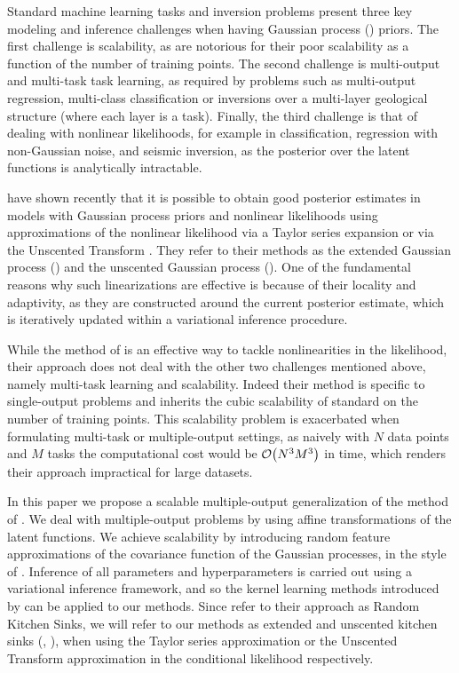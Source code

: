 Standard machine learning tasks and inversion problems present three key
modeling and inference challenges when having Gaussian process (\gp) priors.
The first challenge is scalability, as  are notorious for their poor
scalability as a function of the number of training points. The second
challenge is multi-output and multi-task task learning, as required by problems
such as multi-output regression, multi-class classification or inversions over a
multi-layer geological structure (where each layer is a task).  Finally, the
third challenge is that of dealing with nonlinear likelihoods, for example in
classification, regression with non-Gaussian noise, and seismic inversion, as
the posterior over the latent functions is analytically intractable.  

\citet{steinberg-bonilla-nips-2014} have shown recently that it is possible to obtain
good posterior estimates in models with Gaussian process priors and nonlinear
likelihoods using  approximations of the nonlinear  likelihood  via a Taylor
series expansion or via the Unscented Transform \citep{Julier2004}.  They refer
to their methods as the extended Gaussian process (\egp)
and the unscented Gaussian process (\ugp).  One of the fundamental reasons why
such linearizations are effective is because of their locality and adaptivity,
as they are constructed around the current posterior estimate, which is
iteratively updated within a variational inference procedure.
 
While the method of \citet{steinberg-bonilla-nips-2014} is an effective way to
tackle nonlinearities in the likelihood, their approach  does not deal with the
other two challenges mentioned above, namely multi-task learning and
scalability. Indeed their method is specific to single-output problems and
inherits the cubic scalability of standard  on the
number of training points. This scalability problem is exacerbated when
formulating  multi-task or multiple-output settings, as naively with $N$ data
points and $M$ tasks the computational cost would be $\mathcal{O}\!\left({{N^3M^3}}\right)$ in
time, which renders their approach impractical for large datasets.  

In this paper we propose a scalable multiple-output generalization  of the
method of \citet{steinberg-bonilla-nips-2014}. We deal with multiple-output
problems by using affine transformations of the latent functions. We achieve
scalability by introducing random feature approximations of the covariance
function of the Gaussian processes, in the style of
\citet{rahimi-recht-nips-2007}. Inference of all parameters and hyperparameters
is carried out using a variational inference framework, and so the kernel
learning methods introduced by \citet{yang-et-al-aistats-2015} can be
applied to our methods. Since \citet{rahimi-recht-nips-2007} refer to their
approach as Random Kitchen Sinks, we will refer to our methods as extended and
unscented kitchen sinks (\eks, \uks), when using the Taylor series
approximation or the Unscented Transform approximation in the conditional
likelihood respectively. 

